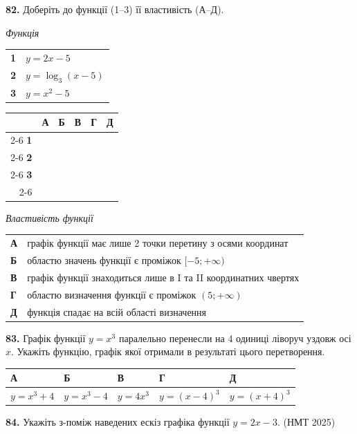 \documentclass[14pt]{extarticle}
\newcommand{\answerTableTall}[5]{
\begin{center}
\begin{tabular}{|*{5}{>{\centering\arraybackslash}m{2.8cm}|}}
\hline
\rule[-0.3cm]{0pt}{0.8cm}\textbf{А} & \textbf{Б} & \textbf{В} & \textbf{Г} & \textbf{Д} \\
\hline
\rule[-0.9cm]{0pt}{2.0cm}#1 & 
\rule[-0.9cm]{0pt}{2.0cm}#2 & 
\rule[-0.9cm]{0pt}{2.0cm}#3 & 
\rule[-0.9cm]{0pt}{2.0cm}#4 & 
\rule[-0.9cm]{0pt}{2.0cm}#5 \\
\hline
\end{tabular}
\end{center}
}
\newcommand{\answerGrid}{
    \begingroup
    \renewcommand{\arraystretch}{1.3} 
    \setlength{\tabcolsep}{7pt} 
    \begin{tabular}{r|c|c|c|c|c|}
         \multicolumn{1}{c}{} & \multicolumn{1}{c}{\textbf{А}} & \multicolumn{1}{c}{\textbf{Б}} & \multicolumn{1}{c}{\textbf{В}} & \multicolumn{1}{c}{\textbf{Г}} & \multicolumn{1}{c}{\textbf{Д}} \\ \cline{2-6}
         \textbf{1} & & & & & \\ \cline{2-6}
         \textbf{2} & & & & & \\ \cline{2-6}
         \textbf{3} & & & & & \\ \cline{2-6}
    \end{tabular}
    \endgroup
}
\newcommand{\nmtyear}[1]{\hfill{\small\color{yearcolor}(НМТ #1)}}
\begin{document}
\noindent\textbf{82.} Доберіть до функції (1--3) її властивість (А--Д).

\vspace{0.3cm}

\noindent
\begin{minipage}[t]{0.45\textwidth}
    \textit{Функція} \par \vspace{0.2cm}
    \begin{tabular}{@{}p{0.5cm} l@{}}
    \textbf{1} & $y=2x-5$ \\[0.4cm]
    \textbf{2} & $y=\log_3(x-5)$ \\[0.4cm]
    \textbf{3} & $y=x^2-5$ \\
    \end{tabular}

    \vspace{1.0cm}
    \answerGrid
\end{minipage}%
\hfill
\begin{minipage}[t]{0.50\textwidth}
    \textit{Властивість функції} \par \vspace{0.2cm}
    \begin{tabular}{@{}p{0.5cm} p{7cm}@{}}
    \textbf{А} & графік функції має лише 2 точки перетину з осями координат \\[0.2cm]
    \textbf{Б} & областю значень функції є проміжок $[-5; +\infty)$ \\[0.2cm]
    \textbf{В} & графік функції знаходиться лише в I та II координатних чвертях \\[0.2cm]
    \textbf{Г} & областю визначення функції є проміжок $(5; +\infty)$ \\[0.2cm]
    \textbf{Д} & функція спадає на всій області визначення \\
    \end{tabular}
\end{minipage}

\vspace{0.7cm}

\noindent\textbf{83.} Графік функції $y=x^3$ паралельно перенесли на 4 одиниці ліворуч уздовж осі $x$. Укажіть функцію, графік якої отримали в результаті цього перетворення.

\vspace{0.3cm}
\answerTableTall{$y=x^3+4$}{$y=x^3-4$}{$y=4x^3$}{$y=(x-4)^3$}{$y=(x+4)^3$}


\noindent\textbf{84.} Укажіть з-поміж наведених ескіз графіка функції $y = 2x - 3$. \nmtyear{2025}
\end{document}
